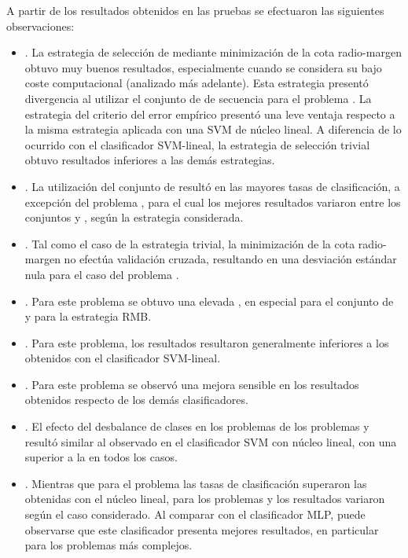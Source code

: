 %

A partir de los resultados obtenidos en las pruebas se efectuaron las
siguientes observaciones:
%
%
\begin{itemize}
\item
  .
  La estrategia de selección de  mediante minimización de la
  cota radio-margen obtuvo muy buenos resultados, especialmente cuando
  se considera su bajo coste computacional (analizado más adelante).
  Esta estrategia presentó divergencia al utilizar el conjunto de
   de secuencia  para el problema \prob\mipred{}.
  La estrategia del criterio del error empírico presentó una leve
  ventaja respecto a la misma estrategia aplicada con una SVM de
  núcleo lineal.
  A diferencia de lo ocurrido con el clasificador SVM-lineal, la
  estrategia de selección trivial obtuvo resultados inferiores a las
  demás estrategias.
\item
  .
  La utilización del conjunto de   resultó en las
  mayores tasas de clasificación, a excepción del problema
  \prob\mipred{}, para el cual los mejores resultados variaron entre
  los conjuntos  y , según la estrategia considerada.
\item
  .
  Tal como el caso de la estrategia trivial, la minimización de la
  cota radio-margen no efectúa validación cruzada, resultando en una
  desviación estándar nula para el caso del problema
  \prob\tripletsvm{}.
\item
  .
  Para este problema se obtuvo una elevada \SE{}, en especial para el
  conjunto de   y para la estrategia RMB.
\item
  .
  Para este problema, los resultados resultaron generalmente
  inferiores a los obtenidos con el clasificador SVM-lineal.
\item
  .
  Para este problema se observó una mejora sensible en los resultados
  obtenidos respecto de los demás clasificadores.
\item
  .
  El efecto del desbalance de clases en los problemas de los problemas
  \prob\mipred{} y \prob\micropred{} resultó similar al observado en
  el clasificador SVM con núcleo lineal, con una \SP{} superior a la
  \SE{} en todos los casos.
\item
  .
  Mientras que para el problema \prob\tripletsvm{} las tasas de
  clasificación superaron las obtenidas con el núcleo lineal, para los
  problemas \prob\mipred{} y \prob\micropred{} los resultados variaron
  según el caso considerado.
  Al comparar con el clasificador MLP, puede observarse que este
  clasificador presenta mejores resultados, en particular para los
  problemas más complejos.
\end{itemize}
%
